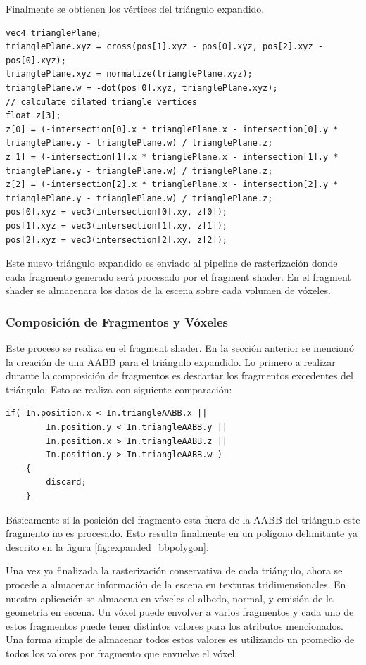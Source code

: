 Finalmente se obtienen los vértices del triángulo expandido.
\\
\begin{lstlisting}[caption={Vértices del triángulo expandido.}, label=TPlanes3]
vec4 trianglePlane;
trianglePlane.xyz = cross(pos[1].xyz - pos[0].xyz, pos[2].xyz - pos[0].xyz);
trianglePlane.xyz = normalize(trianglePlane.xyz);
trianglePlane.w = -dot(pos[0].xyz, trianglePlane.xyz);
// calculate dilated triangle vertices
float z[3];
z[0] = (-intersection[0].x * trianglePlane.x - intersection[0].y * trianglePlane.y - trianglePlane.w) / trianglePlane.z;
z[1] = (-intersection[1].x * trianglePlane.x - intersection[1].y * trianglePlane.y - trianglePlane.w) / trianglePlane.z;
z[2] = (-intersection[2].x * trianglePlane.x - intersection[2].y * trianglePlane.y - trianglePlane.w) / trianglePlane.z;
pos[0].xyz = vec3(intersection[0].xy, z[0]);
pos[1].xyz = vec3(intersection[1].xy, z[1]);
pos[2].xyz = vec3(intersection[2].xy, z[2]);
\end{lstlisting}

Este nuevo triángulo expandido es enviado al pipeline de rasterización donde cada fragmento generado será procesado por el fragment shader. En el fragment shader se almacenara los datos de la escena sobre cada volumen de vóxeles.

\subsubsection{Composición de Fragmentos y Vóxeles}

Este proceso se realiza en el fragment shader. En la sección anterior se mencionó la creación de una \ac{AABB} para el triángulo expandido. Lo primero a realizar durante la composición de fragmentos es descartar los fragmentos excedentes del triángulo. Esto se realiza con siguiente comparación:
\\
\begin{lstlisting}[caption={Descarte de fragmentos excedentes en el fragment shader.}, label=TPlanes4]
    if( In.position.x < In.triangleAABB.x || 
    	In.position.y < In.triangleAABB.y || 
		In.position.x > In.triangleAABB.z || 
		In.position.y > In.triangleAABB.w )
	{
		discard;
	}
\end{lstlisting}
Básicamente si la posición del fragmento esta fuera de la \ac{AABB} del triángulo este fragmento no es procesado. Esto resulta finalmente en un polígono delimitante ya descrito en la figura \ref{fig:expanded_bbpolygon}.

Una vez ya finalizada la rasterización conservativa de cada triángulo, ahora se procede a almacenar información de la escena en texturas tridimensionales. En nuestra aplicación se almacena en vóxeles el albedo, normal, y emisión de la geometría en escena. Un vóxel puede envolver a varios fragmentos y cada uno de estos fragmentos puede tener distintos valores para los atributos mencionados. Una forma simple de almacenar todos estos valores es utilizando un promedio de todos los valores por fragmento que envuelve el vóxel. 

